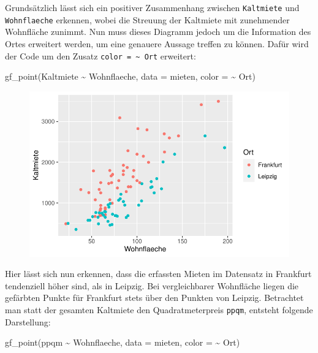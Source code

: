 \documentclass[
  a4paper,
  DIV=11]{scrartcl}
\newenvironment{Shaded}{\begin{snugshade}}{\end{snugshade}}
\newcommand{\AttributeTok}[1]{\textcolor[rgb]{0.40,0.45,0.13}{#1}}
\newcommand{\FunctionTok}[1]{\textcolor[rgb]{0.28,0.35,0.67}{#1}}
\newcommand{\NormalTok}[1]{\textcolor[rgb]{0.00,0.23,0.31}{#1}}
\newcommand{\SpecialCharTok}[1]{\textcolor[rgb]{0.37,0.37,0.37}{#1}}
\begin{document}
Grundsätzlich lässt sich ein positiver Zusammenhang zwischen
\texttt{Kaltmiete} und \texttt{Wohnflaeche} erkennen, wobei die Streuung
der Kaltmiete mit zunehmender Wohnfläche zunimmt. Nun muss dieses
Diagramm jedoch um die Information des Ortes erweitert werden, um eine
genauere Aussage treffen zu können. Dafür wird der Code um den Zusatz
\texttt{color\ =\ \textasciitilde{}\ Ort} erweitert:

\begin{Shaded}
\begin{Highlighting}[]
\FunctionTok{gf\_point}\NormalTok{(Kaltmiete }\SpecialCharTok{\textasciitilde{}}\NormalTok{ Wohnflaeche, }\AttributeTok{data =}\NormalTok{ mieten, }\AttributeTok{color =} \SpecialCharTok{\textasciitilde{}}\NormalTok{ Ort)}
\end{Highlighting}
\end{Shaded}

\begin{figure}[H]

{\centering \includegraphics{Mietmodellierung_files/figure-pdf/unnamed-chunk-8-1.pdf}

}

\end{figure}

Hier lässt sich nun erkennen, dass die erfassten Mieten im Datensatz in
Frankfurt tendenziell höher sind, als in Leipzig. Bei vergleichbarer
Wohnfläche liegen die gefärbten Punkte für Frankfurt stets über den
Punkten von Leipzig. Betrachtet man statt der gesamten Kaltmiete den
Quadratmeterpreis \texttt{ppqm}, entsteht folgende Darstellung:

\begin{Shaded}
\begin{Highlighting}[]
\FunctionTok{gf\_point}\NormalTok{(ppqm }\SpecialCharTok{\textasciitilde{}}\NormalTok{ Wohnflaeche, }\AttributeTok{data =}\NormalTok{ mieten, }\AttributeTok{color =} \SpecialCharTok{\textasciitilde{}}\NormalTok{ Ort)}
\end{Highlighting}
\end{Shaded}
\end{document}
